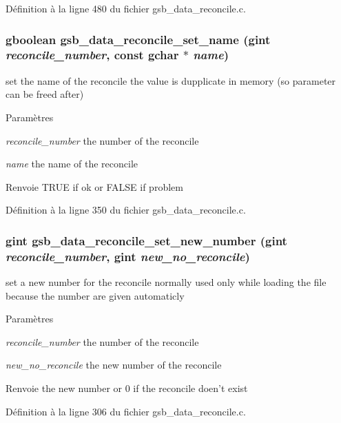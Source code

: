 Définition à la ligne 480 du fichier gsb\_\-data\_\-reconcile.c.

\subsubsection[{gsb\_\-data\_\-reconcile\_\-set\_\-name}]{\setlength{\rightskip}{0pt plus 5cm}gboolean gsb\_\-data\_\-reconcile\_\-set\_\-name (gint {\em reconcile\_\-number}, \/  const gchar $\ast$ {\em name})}\label{gsb__data__reconcile_8h_ad4723e032886e6a97aa32b39363463f1}
set the name of the reconcile the value is dupplicate in memory (so parameter can be freed after)


\begin{DoxyParams}{Paramètres}
\item[{\em reconcile\_\-number}]the number of the reconcile \item[{\em name}]the name of the reconcile\end{DoxyParams}
\begin{DoxyReturn}{Renvoie}
TRUE if ok or FALSE if problem 
\end{DoxyReturn}


Définition à la ligne 350 du fichier gsb\_\-data\_\-reconcile.c.

\subsubsection[{gsb\_\-data\_\-reconcile\_\-set\_\-new\_\-number}]{\setlength{\rightskip}{0pt plus 5cm}gint gsb\_\-data\_\-reconcile\_\-set\_\-new\_\-number (gint {\em reconcile\_\-number}, \/  gint {\em new\_\-no\_\-reconcile})}\label{gsb__data__reconcile_8h_aa86c8172d748f9c6d545e0062818578d}
set a new number for the reconcile normally used only while loading the file because the number are given automaticly


\begin{DoxyParams}{Paramètres}
\item[{\em reconcile\_\-number}]the number of the reconcile \item[{\em new\_\-no\_\-reconcile}]the new number of the reconcile\end{DoxyParams}
\begin{DoxyReturn}{Renvoie}
the new number or 0 if the reconcile doen't exist 
\end{DoxyReturn}


Définition à la ligne 306 du fichier gsb\_\-data\_\-reconcile.c.

